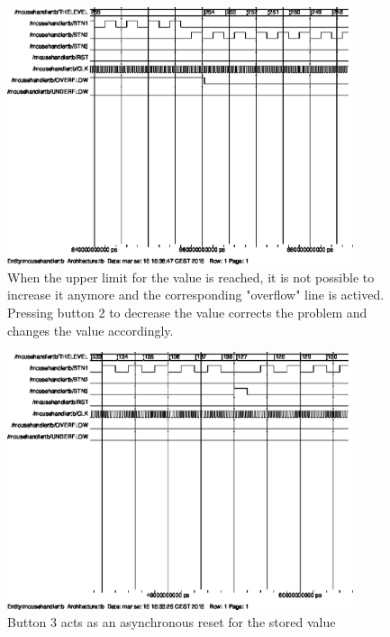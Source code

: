 \begin{figure}[htbp]
\centering
\includegraphics[width=4in]{Graphics/mouseOFW}
\caption{When the upper limit for the value is reached, it is not possible to increase it anymore and the corresponding "overflow" line is actived. Pressing button 2 to decrease the value corrects the problem and changes the value accordingly.}
\end{figure}

\begin{figure}[htbp]
\centering
\includegraphics[width=4in]{Graphics/mouseRST}
\caption{Button 3 acts as an asynchronous reset for the stored value}
\end{figure}




